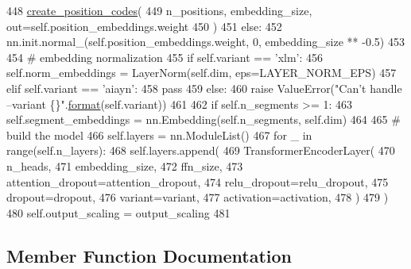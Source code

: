\begin{DoxyCode}
448             \hyperlink{namespaceparlai_1_1agents_1_1transformer_1_1modules_a0b86437e6e9682fa3100e9cadcaae259}{create\_position\_codes}(
449                 n\_positions, embedding\_size, out=self.position\_embeddings.weight
450             )
451         \textcolor{keywordflow}{else}:
452             nn.init.normal\_(self.position\_embeddings.weight, 0, embedding\_size ** -0.5)
453 
454         \textcolor{comment}{# embedding normalization}
455         \textcolor{keywordflow}{if} self.variant == \textcolor{stringliteral}{'xlm'}:
456             self.norm\_embeddings = LayerNorm(self.dim, eps=LAYER\_NORM\_EPS)
457         \textcolor{keywordflow}{elif} self.variant == \textcolor{stringliteral}{'aiayn'}:
458             \textcolor{keywordflow}{pass}
459         \textcolor{keywordflow}{else}:
460             \textcolor{keywordflow}{raise} ValueError(\textcolor{stringliteral}{"Can't handle --variant \{\}"}.\hyperlink{namespaceparlai_1_1chat__service_1_1services_1_1messenger_1_1shared__utils_a32e2e2022b824fbaf80c747160b52a76}{format}(self.variant))
461 
462         \textcolor{keywordflow}{if} self.n\_segments >= 1:
463             self.segment\_embeddings = nn.Embedding(self.n\_segments, self.dim)
464 
465         \textcolor{comment}{# build the model}
466         self.layers = nn.ModuleList()
467         \textcolor{keywordflow}{for} \_ \textcolor{keywordflow}{in} range(self.n\_layers):
468             self.layers.append(
469                 TransformerEncoderLayer(
470                     n\_heads,
471                     embedding\_size,
472                     ffn\_size,
473                     attention\_dropout=attention\_dropout,
474                     relu\_dropout=relu\_dropout,
475                     dropout=dropout,
476                     variant=variant,
477                     activation=activation,
478                 )
479             )
480         self.output\_scaling = output\_scaling
481 
\end{DoxyCode}


\subsection{Member Function Documentation}
\mbox{\label{classparlai_1_1agents_1_1transformer_1_1modules_1_1TransformerEncoder_a23005871ba6683940f63511ed463266f}} 
